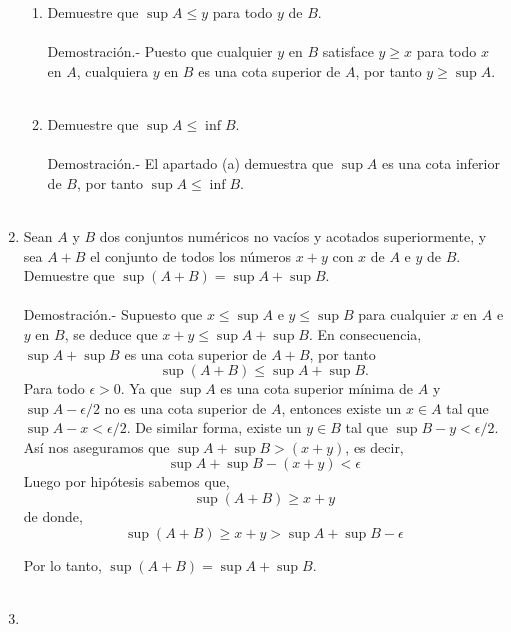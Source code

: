 \begin{enumerate}[\bfseries 1.]
\begin{enumerate}[\bfseries (a)]
	    \item Demuestre que $\sup A \leq y$ para todo $y$ de $B$.\\\\
		Demostración.-\; Puesto que cualquier $y$ en $B$ satisface $y\geq x$ para todo $x$ en $A$, cualquiera $y$ en $B$ es una cota superior de $A$, por tanto $y\geq \sup A$.\\\\ 

	    \item Demuestre que $\sup A \leq \inf B.$\\\\
		Demostración.-\; El apartado (a) demuestra que $\sup A$ es una cota inferior de $B$, por tanto $\sup A \leq \inf B.$\\\\

	\end{enumerate}

    \item Sean $A$ y $B$ dos conjuntos numéricos no vacíos y acotados superiormente, y sea $A+B$ el conjunto de todos los números $x+y$ con $x$ de $A$ e $y$ de $B$. Demuestre que $\sup(A+B)=\sup A + \sup B$.\\\\
	Demostración.-\; Supuesto que $x\leq \sup A$ e $y\leq \sup B$ para cualquier $x$ en $A$ e $y$ en $B$, se deduce que $x+y\leq \sup A + \sup B$. En consecuencia, $\sup A + \sup B$ es una cota superior de $A+B$, por tanto $$\sup(A+B)\leq \sup A + \sup B.$$
	Para todo $\epsilon>0$. Ya que $\sup A$ es una cota superior mínima de $A$ y $\sup A - \epsilon/2$ no es una cota superior de $A$, entonces existe un $x\in A$ tal que $\sup A-x<\epsilon/2$. De similar forma, existe un $y\in B$ tal que $\sup B - y < \epsilon/2.$ Así nos aseguramos que $\sup A + \sup B>(x+y)$, es decir,
	$$\sup A + \sup B - (x+y)<\epsilon$$
	Luego por hipótesis sabemos que,
	$$\sup(A+B)\geq x+y$$
	de donde,
	$$\sup(A+B)\geq x+y>\sup A + \sup B - \epsilon$$

	Por lo tanto, $\sup(A+B)=\sup A + \sup B$.\\\\

    \item 
	\begin{enumerate}[\bfseries (a)]


\end{enumerate}
\end{enumerate}
